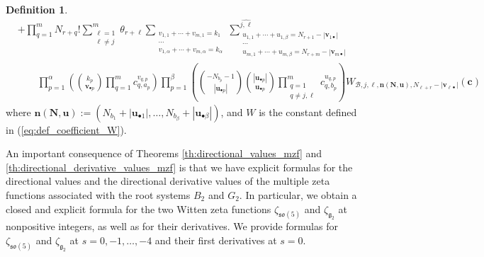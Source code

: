 \documentclass[a4paper]{amsart}
\theoremstyle{remark}
\theoremstyle{definition}
\newtheorem{definition}[theorem]{Definition}
\begin{document}
\begin{definition}
\begin{align}
    & + \prod_{q=1}^{m} N_{r+q}! \sum_{\substack{\ell=1 \\ \ell \neq j}}^{m} \theta_{r+\ell} \sum_{\substack{v_{1,1}+\cdots+v_{m,1}=k_1 \\ \cdots \\ v_{1,\alpha}+\cdots+v_{m,\alpha} = k_{\alpha}}} \sum^{\widehat{j,\ell}}_{\substack{u_{1,1}+\cdots+u_{1,\beta}=N_{r+1}-|\mathbf{v}_{1 \bullet}| \\ \cdots \\ u_{m,1}+\cdots+u_{m,\beta}=N_{r+m}-|\mathbf{v}_{m \bullet}|}} \nonumber  \\
    & \qquad \prod_{p=1}^{\alpha} \left( \binom{k_p}{\mathbf{v}_{\bullet p}} \prod_{q=1}^m c_{q,a_p}^{v_{q,p}} \right) \prod_{p=1}^{\beta} \left( \binom{-N_{b_p}-1}{|\mathbf{u}_{\bullet p}|} \binom{|\mathbf{u}_{\bullet p}|}{\mathbf{u}_{\bullet p}} \prod_{\substack{q=1 \\ q \neq j,\ell}}^m c_{q,b_p}^{u_{q,p}} \right) W_{\mathcal{B},j,\ell,\mathbf{n}(\mathbf{N},\mathbf{u}),N_{\ell+r}-|\mathbf{v}_{\ell \bullet}|}(\mathbf{c}) \nonumber
\end{align}
where $\mathbf{n}(\mathbf{N},\mathbf{u}):=(N_{b_1}+|\mathbf{u}_{\bullet 1}|,\ldots,N_{b_\beta}+|\mathbf{u}_{\bullet \beta}|)$, and $W$ is the constant defined in (\ref{eq:def_coefficient_W}).
\end{definition}

An important consequence of Theorems \ref{th:directional_values_mzf} and \ref{th:directional_derivative_values_mzf} is that we have explicit formulas for the directional values and the directional derivative values of the multiple zeta functions associated with the root systems $B_2$ and $G_2$. In particular, we obtain a closed and explicit formula for the two Witten zeta functions $\zeta_{\mathfrak{so}(5)}$ and $\zeta_{\mathfrak{g}_2}$ at nonpositive integers, as well as for their derivatives. We provide formulas for $\zeta_{\mathfrak{so}(5)}$ and $\zeta_{\mathfrak{g}_2}$ at $s=0,-1,\ldots,-4$ and their first derivatives at $s=0$.
\end{document}
